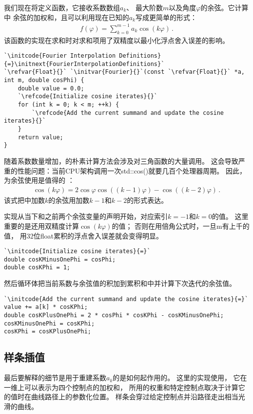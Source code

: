 我们现在将定义函数，它接收系数数组$a_k$、
最大阶数$m$以及角度$\varphi$的余弦。它计算中
余弦的加权和，且可以利用现在已知的$a_k$写成更简单的形式：
\begin{align}\label{eq:8.23}
    f(\varphi)=\sum\limits_{k=0}^{m-1}a_k\cos(k\varphi)\, .
\end{align}
该函数的实现在求和时对求和项用了双精度以最小化浮点舍入误差的影响。
\begin{lstlisting}
`\initcode{Fourier Interpolation Definitions}{=}\initnext{FourierInterpolationDefinitions}`
`\refvar{Float}{}` `\initvar{Fourier}{}`(const `\refvar{Float}{}` *a, int m, double cosPhi) {
    double value = 0.0;
    `\refcode{Initialize cosine iterates}{}`
    for (int k = 0; k < m; ++k) {
        `\refcode{Add the current summand and update the cosine iterates}{}`
    }
    return value;
}
\end{lstlisting}

随着系数数量增加，的朴素计算方法会涉及对三角函数的大量调用。
这会导致严重的性能问题：当前CPU架构调用一次{\ttfamily std::cos()}就要几百个处理器周期。
因此，为余弦使用是值得的
：
\begin{align}\label{eq:8.24}
    \cos(k\varphi)=2\cos\varphi\cos((k-1)\varphi)-\cos((k-2)\varphi)\, .
\end{align}
该式把中加数$k$的余弦用加数$k-1$和$k-2$的形式表达。

实现从当下和之前两个余弦变量的声明开始，对应索引$k=-1$和$k=0$的值。
这里重要的是还用双精度计算$\cos(k\varphi)$的值；
否则在用倍角公式时，一旦{\ttfamily m}有上千的值，
用32位{\ttfamily float}累积的浮点舍入误差就会变得明显。
\begin{lstlisting}
`\initcode{Initialize cosine iterates}{=}`
double cosKMinusOnePhi = cosPhi;
double cosKPhi = 1;
\end{lstlisting}
然后循环体把当前系数与余弦值的积加到累积和中并计算下次迭代的余弦值。
\begin{lstlisting}
`\initcode{Add the current summand and update the cosine iterates}{=}`
value += a[k] * cosKPhi;
double cosKPlusOnePhi = 2 * cosPhi * cosKPhi - cosKMinusOnePhi;
cosKMinusOnePhi = cosKPhi;
cosKPhi = cosKPlusOnePhi;
\end{lstlisting}

\subsection{样条插值}\label{sub:样条插值}
最后要解释的细节是用于重建系数$a_k$的是如何起作用的。
这里的实现使用，
它在一维上可以表示为四个控制点的加权和，
所用的权重和特定控制点取决于计算它的值时在曲线路径上的参数化位置。
样条会穿过给定控制点并沿路径走出相当光滑的曲线。

